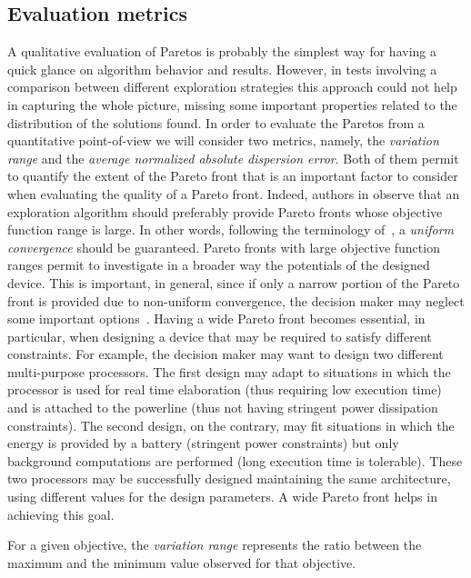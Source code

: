
\subsection{Evaluation metrics}
A qualitative evaluation of Paretos is probably the simplest way for
having a quick glance on algorithm behavior and results. However, in
tests involving a comparison between different exploration strategies
this approach could not help in capturing the whole picture, missing
some important properties related to the distribution of the solutions
found.
In order to evaluate the Paretos from a quantitative point-of-view we
will consider two metrics, namely, the \emph{variation range} and the
\emph{average normalized absolute dispersion error}. Both of them permit to quantify the extent of the Pareto front that is an important factor to consider when evaluating the quality of a Pareto front. Indeed, authors in \cite{zitzler_ec00,weise2012evolutionary} observe that an exploration algorithm should preferably provide Pareto fronts whose objective function range is large. In other words, following the terminology of~\cite{weise2012evolutionary}, a \emph{uniform convergence} should be guaranteed.
Pareto fronts with large objective function ranges permit to investigate in a broader way the potentials of the designed device. This is important, in general, since if only a narrow portion of the Pareto front is provided due to non-uniform convergence, the decision maker may neglect some important options~\cite{weise2012evolutionary}. Having a wide Pareto front becomes essential, in particular, when designing a device that may be required to satisfy different constraints. For example, the decision maker may want to design two different multi-purpose processors. The first design may adapt to situations in which the processor is used for real time elaboration (thus requiring low execution time) and is attached to the powerline (thus not having stringent power dissipation constraints). The second design, on the contrary, may fit situations in which the energy is provided by a battery (stringent power constraints) but only background computations are performed (long execution time is tolerable). These two processors may be successfully designed maintaining the same architecture, using different values for the design parameters. A wide Pareto front helps in achieving this goal.

For a given objective, the \emph{variation range} represents the ratio
between the maximum and the minimum value observed for that objective.

